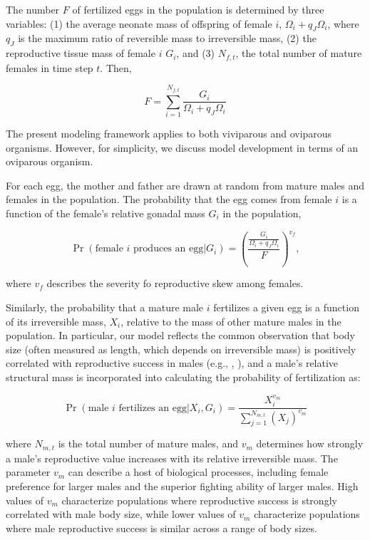 \documentclass[11pt]{article}
\begin{document}
\begin{linenumbers}
The number $F$ of fertilized eggs in the population is determined by three variables: (1) the average neonate mass of offspring of female $i$, $\Omega_i + q_J \Omega_i$, where $q_J$ is the maximum ratio of reversible mass to irreversible mass, (2) the reproductive tissue mass of female $i$ $G_i$, and (3) $N_{f,t}$, the total number of mature females in time step $t$. Then,
\begin{linenomath}
\begin{equation}
\label{eqn:fecundity}
F = \sum_{i=1}^{N_{f,t}} \frac{G_i}{\Omega_i + q_J \Omega_i}
\end{equation}
\end{linenomath}
The present modeling framework applies to both viviparous and oviparous organisms. However, for simplicity, we discuss model development in terms of an oviparous organism. 

For each egg, the mother and father are drawn at random from mature males and females in the population. The probability that the egg comes from female $i$ is a function of the female's relative gonadal mass $G_i$ in the population,
\begin{linenomath}
\begin{equation}
\label{eqn:Femalerepr}
\Pr(\textrm{female $i$ produces an egg} | G_i) = (\frac{\frac{G_i}{\Omega_i + q_J \Omega_i }}{F})^{v_f},
\end{equation}
\end{linenomath}
where $v_f$ describes the severity fo reproductive skew among females.

\indent Similarly, the probability that a mature male $i$ fertilizes a given egg is a function of its irreversible mass, $X_i$, relative to the mass of other mature males in the population. In particular, our model reflects the common observation that body size (often measured as length, which depends on irreversible mass) is positively correlated with reproductive success in males (e.g., \citealt{trivers72}, \citealt{blanckenhorn05}), and a male's relative structural mass is incorporated into calculating the probability of fertilization as: 
\begin{linenomath}
\begin{equation}
\Pr(\textrm{male $i$ fertilizes an egg} |X_i, G_i) = \frac{X_i^{v_m}}{\sum_{j=1}^{N_{m,t}}(X_j)^{v_m}}
\end{equation}
\end{linenomath}
where $N_{m,t}$ is the total number of mature males, and $v_m$ determines how strongly a male's reproductive value increases with its relative irreversible mass. The parameter $v_m$ can describe a host of biological processes, including female preference for larger males and the superior fighting ability of larger males. High values of $v_m$ characterize populations where reproductive success is strongly correlated with male body size, while lower values of $v_m$ characterize populations where male reproductive success is similar across a range of body sizes. 


\end{linenumbers}
\end{document}
